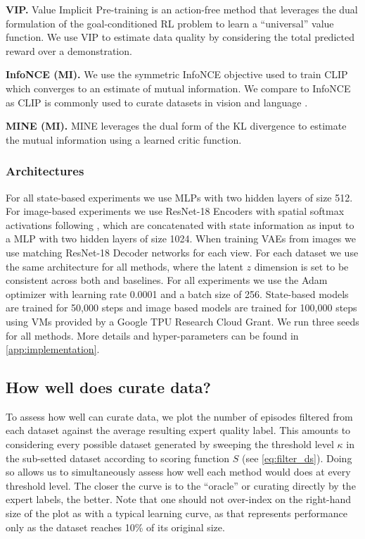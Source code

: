\noindent \textbf{VIP.} Value Implicit Pre-training \citep{ma2023vip} is an action-free method that leverages the dual formulation of the goal-conditioned RL problem to learn a ``universal'' value function. We use VIP to estimate data quality by considering the total predicted reward over a demonstration. 

\noindent \textbf{InfoNCE (MI).} We use the symmetric InfoNCE \citep{oord2018representation} objective used to train CLIP \citep{radford2021learning} which converges to an estimate of mutual information. We compare to InfoNCE as CLIP is commonly used to curate datasets in vision and language \citep{schuhmann2022laion}.

\noindent \textbf{MINE (MI).} MINE \citep{belghazi2018mine} leverages the dual form of the KL divergence to estimate the mutual information using a learned critic function. 


\subsubsection{Architectures}
For all state-based experiments we use MLPs with two hidden layers of size 512. For image-based experiments we use ResNet-18 Encoders \citep{he2016deep} with spatial softmax activations following \citet{robomimic}, which are concatenated with state information as input to a MLP with two hidden layers of size 1024. When training VAEs from images we use matching ResNet-18 Decoder networks for each view. For each dataset we use the same architecture for all methods, where the latent $z$ dimension is set to be consistent across both \abv and baselines. For all experiments we use the Adam optimizer with learning rate 0.0001 and a batch size of 256. State-based models are trained for 50,000 steps and image based models are trained for 100,000 steps using VMs provided by a Google TPU Research Cloud Grant. We run three seeds for all methods. More details and hyper-parameters can be found in \cref{app:implementation}.



\subsection{How well does \abv curate data?}

To assess how well \abv can curate data, we plot the number of episodes filtered from each dataset against the average resulting expert quality label. This amounts to considering every possible dataset generated by sweeping the threshold level $\kappa$ in the sub-setted dataset according to scoring function $S$ (see \cref{eq:filter_ds}). Doing so allows us to simultaneously assess how well each method would does at every threshold level. The closer the curve is to the ``oracle'' or curating directly by the expert labels, the better. Note that one should not over-index on the right-hand size of the plot as with a typical learning curve, as that represents performance only as the dataset reaches 10\% of its original size.


